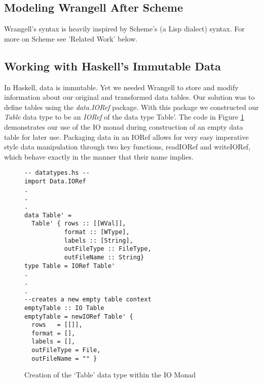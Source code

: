 \documentclass[preprint,nocopyrightspace]{sig-alternate}
\begin{document}
\subsection{Modeling Wrangell After Scheme}
Wrangell's syntax is heavily inspired by Scheme's (a Lisp dialect) syntax. For more on Scheme see 'Related Work' below. 


\subsection{Working with Haskell's Immutable Data}
In Haskell, data is immutable. Yet we needed Wrangell to store and modify information about our original and transformed data tables. Our solution was to define tables using the \emph{data.IORef} package. With this package we constructed our \emph{Table} data type to be an \emph{IORef} of the data type Table'. The code in Figure \ref{tableIORef} demonstrates our use of the IO monad during construction of an empty data table for later use. Packaging data in an IORef allows for very easy imperative style data manipulation through two key functions, readIORef and writeIORef, which behave exactly in the manner that their name implies. 

\begin{figure}
\caption{Creation of the `Table' data type within the IO Monad}
\begin{lstlisting}
-- datatypes.hs --
import Data.IORef
.
.
.
data Table' = 
  Table' { rows :: [[WVal]], 
           format :: [WType],
           labels :: [String],
           outFileType :: FileType, 
           outFileName :: String}
type Table = IORef Table'
.
.
.
--creates a new empty table context
emptyTable :: IO Table
emptyTable = newIORef Table' {
  rows   = [[]],
  format = [],
  labels = [],
  outFileType = File,
  outFileName = "" }
\end{lstlisting}
\label{tableIORef}
\end{figure}
\end{document}
